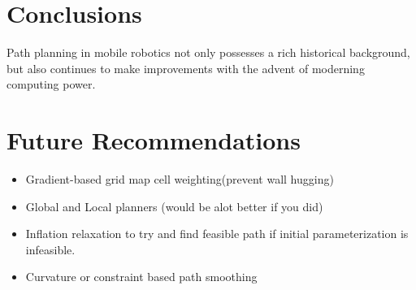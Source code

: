 \documentclass[journal]{IEEEtran}
\begin{document}
\section{Conclusions}

Path planning in mobile robotics not only possesses a rich historical background, but also continues to make improvements with the advent of moderning computing power. 


\section{Future Recommendations}

\begin{itemize}
  \item Gradient-based grid map cell weighting(prevent wall hugging)
  \item Global and Local planners (would be alot better if you did)
  \item Inflation relaxation to try and find feasible path if initial parameterization is infeasible.
  \item Curvature or constraint based path smoothing
\end{itemize}







\end{document}
